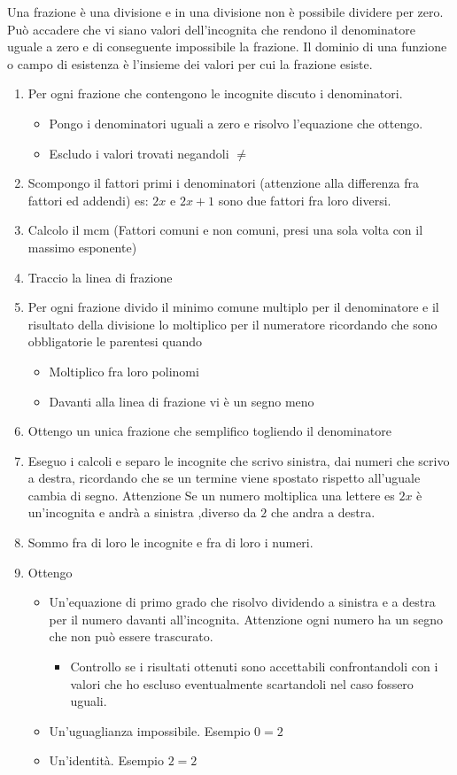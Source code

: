 Una frazione è una divisione e in una divisione non è possibile dividere per zero. Può accadere  che vi siano valori dell'incognita che rendono il denominatore uguale a zero e di conseguente impossibile la frazione. Il dominio di una funzione o campo di esistenza è l'insieme dei valori per cui la frazione esiste.
\begin{procedurat}{}{}
\begin{enumerate}
\item Per ogni frazione che contengono le incognite discuto i denominatori.
	\begin{itemize}
	\item Pongo i denominatori uguali a zero e risolvo l'equazione che ottengo.
	\item Escludo i valori trovati negandoli $\neq$
	\end{itemize}
	\item  Scompongo il fattori primi i denominatori (attenzione alla differenza fra fattori ed addendi) es: $2x$ e  $2x+1$ sono due fattori fra loro diversi.
	\item Calcolo il mcm (Fattori comuni e non comuni, presi una sola volta con il massimo esponente)
	\item Traccio la linea di frazione 
	\item Per ogni frazione divido il minimo comune multiplo per il denominatore e il risultato della divisione lo moltiplico per il numeratore ricordando che sono obbligatorie le parentesi quando 
	\begin{itemize}
	\item Moltiplico fra loro polinomi
	\item Davanti alla linea di frazione vi è un segno meno
	\end{itemize}
	\item Ottengo un unica frazione che semplifico togliendo il denominatore
	\item Eseguo i calcoli e separo le incognite che scrivo sinistra, dai numeri che scrivo a destra, ricordando che  se un termine viene spostato rispetto all'uguale cambia di segno. Attenzione Se un numero moltiplica una lettere es $2x$ è un'incognita e andrà a sinistra ,diverso da $2$ che andra a destra.
	\item Sommo fra di loro le incognite e fra di loro i numeri.
	\item Ottengo 
	\begin{itemize}
	\item Un'equazione di primo grado che risolvo dividendo  a sinistra e a destra per il numero davanti all'incognita. Attenzione ogni numero ha un segno che non può essere trascurato.
	\begin{itemize}
	\item Controllo se i risultati ottenuti  sono accettabili confrontandoli con i valori che ho escluso eventualmente scartandoli nel caso fossero uguali.
	\end{itemize}
	\item Un'uguaglianza impossibile. Esempio $0=2$
	\item Un'identità. Esempio $2=2$
	\end{itemize}
\end{enumerate}
\end{procedurat}
